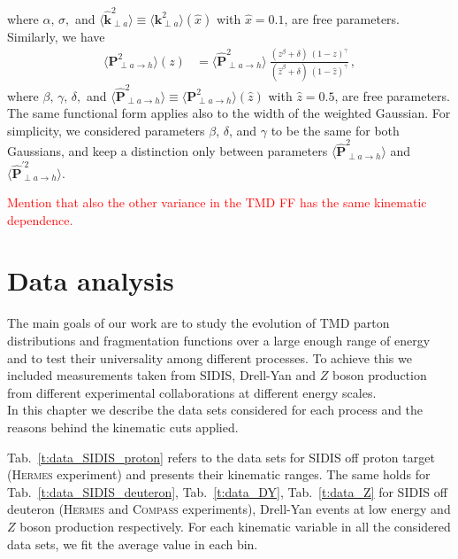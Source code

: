 \documentclass[aps,preprintnumbers,showpacs,nofootinbib,superscriptaddress,floatfix]{revtex4}
\newcommand{\hermes}{\textsc{Hermes }}
\newcommand{\compass}{\textsc{Compass }}
\newcommand{\T}{\perp}
\begin{document}
where $\alpha, \, \sigma,$ and $\big\langle \hat{\bm{k}}_{\T a}^2 \big\rangle \equiv \big\langle \bm{k}_{\T a}^2 \big\rangle (\hat{x})$ with $\hat{x} = 0.1$, are free parameters. Similarly, we have
\begin{align}  
\big\langle \bm{P}_{\T a \to h}^2 \big\rangle (z) &= \big\langle \hat{\bm{P}}_{\T a \to h}^2 \big\rangle \  
               \frac{ (z^{\beta} + \delta)\ (1-z)^{\gamma} }{ (\hat{z}^{\beta} + \delta)\   (1 - \hat{z})^{\gamma} } \, ,
 \label{e:PT2_kin}
 \end{align}
where $\beta, \, \gamma, \, \delta, $ and $\big\langle \hat{\bm{P}}_{\T a \to
  h}^2 \big\rangle \equiv \big \langle \bm{P}_{\T a \to h}^2 \big\rangle
(\hat{z})$ with $\hat{z} = 0.5$, are free parameters. The same functional form
applies also to the width of the weighted Gaussian. For simplicity, we
considered parameters $\beta$, $\delta$, and $\gamma$ to be the same for both
Gaussians, and keep a distinction only between parameters 
$\big\langle \hat{\bm{P}}_{\T a \to  h}^2 \big\rangle$ and
$\big\langle \hat{\bm{P}}_{\T a \to  h}^{\prime 2} \big\rangle$.
 
\textcolor{red}{Mention that also the other variance in the TMD FF has the same kinematic dependence.}
%




\newpage
\section{Data analysis}
\label{s:data_analysis}


The main goals of our work are to study the evolution of TMD parton distributions and fragmentation functions over a large enough range of energy and to test their universality among different processes. To achieve this we included measurements taken from SIDIS, Drell-Yan and $Z$ boson production from different experimental collaborations at different energy scales. \\
In this chapter we describe the data sets considered for each process and the reasons behind the kinematic cuts applied.

Tab.~\ref{t:data_SIDIS_proton} refers to the data sets for SIDIS off proton target (\hermes experiment) and presents their kinematic ranges. 
The same holds for Tab.~\ref{t:data_SIDIS_deuteron}, Tab.~\ref{t:data_DY}, Tab.~\ref{t:data_Z} for SIDIS off deuteron (\hermes and \compass experiments), Drell-Yan events at low energy and $Z$ boson production respectively. 
For each kinematic variable in all the considered data sets, we fit the average value in each bin.
 
\end{document}
